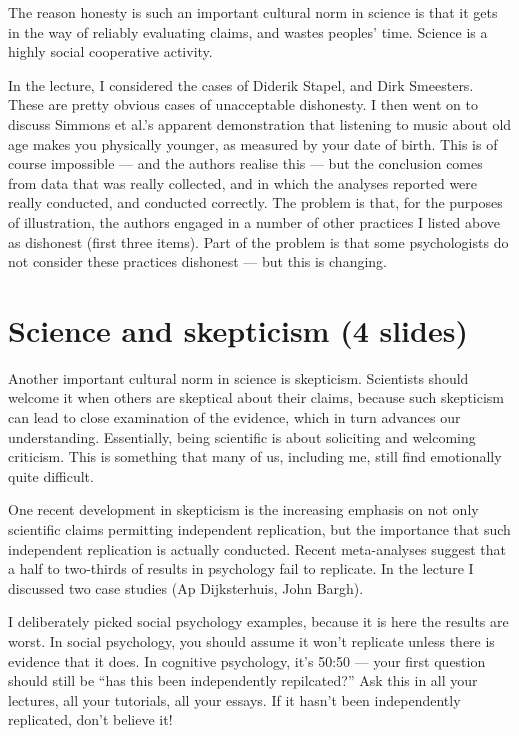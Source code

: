 \documentclass[12pt]{article}
\begin{document}
The reason honesty is such an important cultural norm in science is
that it gets in the way of reliably evaluating claims, and wastes
peoples' time. Science is a highly social cooperative activity.

In the lecture, I considered the cases of Diderik Stapel, and Dirk
Smeesters. These are pretty obvious cases of unacceptable
dishonesty. I then went on to discuss Simmons et al.'s apparent
demonstration that listening to music about old age makes you
physically younger, as measured by your date of birth. This is of
course impossible --- and the authors realise this --- but the
conclusion comes from data that was really collected, and in which the
analyses reported were really conducted, and conducted correctly. The
problem is that, for the purposes of illustration, the authors engaged
in a number of other practices I listed above as dishonest (first
three items). Part of the problem is that some psychologists do not
consider these practices dishonest --- but this is changing.

\section{Science and skepticism (4 slides)}

Another important cultural norm in science is skepticism. Scientists
should welcome it when others are skeptical about their claims,
because such skepticism can lead to close examination of the evidence,
which in turn advances our understanding. Essentially, being
scientific is about soliciting and welcoming criticism. This is
something that many of us, including me, still find emotionally quite
difficult.

One recent development in skepticism is the increasing emphasis on not
only scientific claims permitting independent replication, but the
importance that such independent replication is actually
conducted. Recent meta-analyses suggest that a half to two-thirds of
results in psychology fail to replicate. In the lecture I discussed
two case studies (Ap Dijksterhuis, John Bargh).

I deliberately picked social psychology examples, because it is here
the results are worst. In social psychology, you should assume it
won't replicate unless there is evidence that it does. In cognitive
psychology, it's 50:50 --- your first question should still be ``has
this been independently repilcated?'' Ask this in all your lectures,
all your tutorials, all your essays. If it hasn't been independently
replicated, don't believe it!
\end{document}
